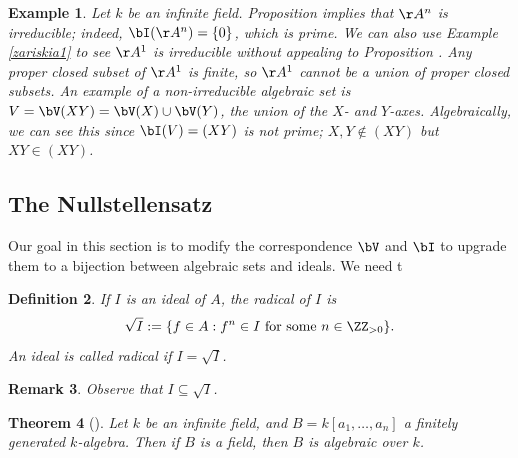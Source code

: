 \documentclass[12pt]{amsart}
\theoremstyle{plain}
\newtheorem{theorem}{Theorem}%
\newtheorem{definition}[theorem]{Definition}
\newtheorem{example}[theorem]{Example}
\newtheorem{remark}[theorem]{Remark}
\begin{document}
\begin{example}
Let $k$ be an infinite field.
Proposition \label{irreducibilityproposition} implies that $\AA^n$ is irreducible;
indeed, $\bI(\AA^n) = \{0\}$, which is prime.
We can also use Example \ref{zariskia1} to see $\AA^1$ is irreducible without appealing to Proposition \label{irreducibilityproposition}.
Any proper closed subset of $\AA^1$ is finite, so $\AA^1$ cannot be a union of proper closed subsets.
An example of a non-irreducible algebraic set is $V = \bV(XY) = \bV(X) \cup \bV(Y)$, the union of the $X$- and $Y$-axes.
Algebraically, we can see this since $\bI(V) = (XY)$ is not prime;
$X, Y \notin (XY)$ but $XY \in (XY)$.
\end{example}

\subsection{The Nullstellensatz}\label{The Nullstellensatz}
Our goal in this section is to modify the correspondence $\bV$ and $\bI$ to upgrade them to a bijection between algebraic sets and ideals.
We need t
\begin{definition}
If $I$ is an ideal of $A$, the \emph{radical} of $I$ is
$$\sqrt{I} := \{f \in A : f^n \in I \text{ for some } n \in \ZZ_{> 0}\}.$$
An ideal is called \emph{radical} if $I = \sqrt{I}$.
\end{definition}

\begin{remark}
Observe that $I \subseteq \sqrt{I}$.
\end{remark}

\begin{theorem}[{\cite[\S 3.8]{Reid88}}]\label{hardfact}
Let $k$ be an infinite field, and $B = k[a_1, \ldots, a_n]$ a finitely generated $k$-algebra.
Then if $B$ is a field, then $B$ is algebraic over $k$.
\end{theorem}
\end{document}
